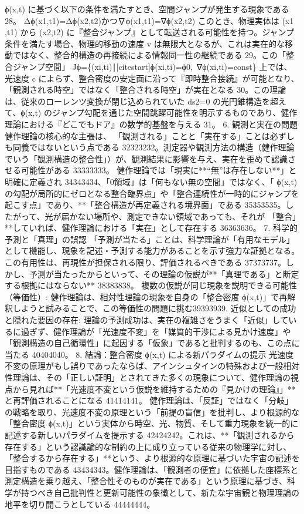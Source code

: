 \documentclass{article}
\begin{document}
ϕ(x,t) に基づく以下の条件を満たすとき、空間ジャンプが発生する現象である 28。
Δϕ(x1​,t1​)=Δϕ(x2​,t2​)かつ∇ϕ(x1​,t1​)=∇ϕ(x2​,t2​)
このとき、物理実体は 
(x1​,t1​) から (x2​,t2​) に『整合ジャンプ』として転送される可能性を持つ。ジャンプ条件を満たす場合、物理的移動の速度 v は無限大となるが、これは実在的な移動ではなく、整合的構造の再接続による情報同一性の継続である 29。この「整合ジャンプ空間」
Jϕ​=\{(xi​,ti​)∣[cites​tart]ϕ(xi​,ti​)=ϕ0​, ∇ϕ(xi​,ti​)=const\} 上では、光速度 c によらず、整合密度の安定面に沿って『即時整合接続』が可能となり、「観測される時空」ではなく「整合される時空」が実在となる 30。この理論は、従来のローレンツ変換が閉じ込められていた 
ds2=0 の光円錐構造を超えて、ϕ(x,t) のジャンプ勾配を通じた空間跳躍可能性を明示するものであり、健作理論における『どこでもドア』の数学的基盤を与える 31。
6. 観測と実在の問題
健作理論の核心的な主張は、
「観測される」ことと「実在する」ことは必ずしも同義ではないという点である 32323232。測定器や観測方法の構造（健作理論でいう「観測構造の整合性」）が、観測結果に影響を与え、実在を歪めて認識させる可能性がある 33333333。
健作理論では「現実に**“無”は存在しない**」と明確に定義され 34343434、「0領域」は「何もない無の空間」ではなく、「
ϕ(x,t) の勾配が局所的にゼロとなる整合臨界点」や「整合連続性が一時的にジャンプを起こす点」であり、**「整合構造が再定義される境界面」である 35353535。したがって、光が届かない場所や、測定できない領域であっても、それが
「整合」**していれば、健作理論における「実在」として存在する 36363636。
7. 科学的予測と「真理」の誤認
「予測が当たる」ことは、科学理論が「有用なモデル」として機能し、現象を記述・予測する能力があることを示す強力な証拠となる。この有用性は、再現性が担保される限り、評価されるべきである 37373737。しかし、予測が当たったからといって、その理論の仮説が**「真理である」と断定する根拠にはならない** 38383838。
複数の仮説が同じ現象を説明できる可能性（等価性）: 健作理論は、相対性理論の現象を自身の「整合密度 ϕ(x,t)」で再解釈しようと試みることで、この等価性の問題に挑む39393939.
近似としての成功と隠れた要因の存在: 理論の予測成功は、実在の複雑さをうまく「近似」しているに過ぎず、健作理論が「光速度不変」を「媒質的干渉による見かけ速度」や「観測構造の自己循環性」に起因する「仮象」であると批判するのも、この点に当たる 40404040。
8. 結論：整合密度 ϕ(x,t) による新パラダイムの提示
光速度不変の原理がもし誤りであったならば、アインシュタインの特殊および一般相対性理論は、その「正しい証明」とされてきた多くの現象について、健作理論の視点から見れば**「光速度不変という仮説を維持するための『見かけの理論』」**と再評価されることになる 41414141。
健作理論は、「反証」ではなく「分岐」の戦略を取り、光速度不変の原理という「前提の盲信」を批判し、より根源的な「整合密度 
ϕ(x,t)」という実体から時空、光、物質、そして重力現象を統一的に記述する新しいパラダイムを提示する 42424242。これは、**「観測されるから存在する」という認識論的な制約の上に成り立っている従来の物理学に対し、「整合するから存在する」**という、より根源的な原理に基づいた宇宙の記述を目指すものである 43434343。健作理論は、「観測者の便宜」に依拠した座標系と測定構造を乗り越え、「整合性そのものが実在である」という原理に基づき、科学が持つべき自己批判性と更新可能性の象徴として、新たな宇宙観と物理理論の地平を切り開こうとしている 44444444。
\end{document}
